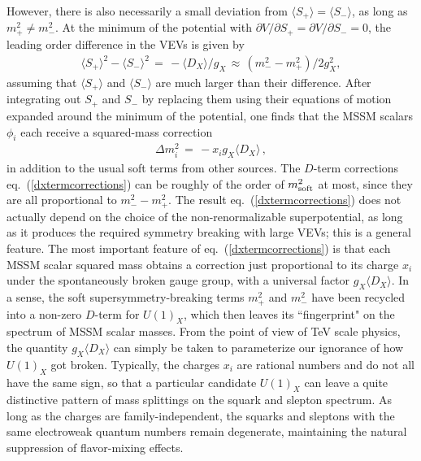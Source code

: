 \documentclass[11pt]{article}
\def\beq{\begin{eqnarray}}
\def\eeq{\end{eqnarray}}
\def\Splus{S_+}
\def\Sminus{S_-}
\begin{document}
However, there is also necessarily a small deviation from $\langle 
\Splus\rangle = \langle \Sminus \rangle$, as long as $m_+^2 \not= 
m_-^2$. At the minimum of the potential with $\partial V/\partial 
\Splus = \partial V/\partial \Sminus = 0$, the leading order difference in 
the VEVs is given by
\beq
 \langle \Splus \rangle^2 - \langle \Sminus \rangle^2 
\,=\, -\langle D_X \rangle/g_X 
\,\approx\,  (m_-^2 - m_+^2)/2 g_X^2,
\eeq
assuming that $\langle \Splus \rangle$ and $\langle \Sminus \rangle$ are 
much larger than their difference. After integrating out $\Splus$ and 
$\Sminus$ by replacing them using their equations of motion expanded 
around the minimum of the potential, one finds that the MSSM scalars 
$\phi_i$ each receive a squared-mass correction
\beq
\Delta m_i^2 \,=\,  -x_i g_X \langle D_X \rangle\, ,
\label{dxtermcorrections}
\eeq
in addition to the usual soft terms from other sources. The $D$-term
corrections eq.~(\ref{dxtermcorrections}) can be roughly of the order of
$m_{\rm soft}^2$ at most, since they are all proportional to $m_-^2-
m_+^2$. The result eq.~(\ref{dxtermcorrections}) does not
actually depend on the choice of the non-renormalizable superpotential, as
long as it produces the required symmetry breaking with large VEVs; this
is a general feature. The most important feature of
eq.~(\ref{dxtermcorrections}) is that each MSSM scalar squared mass
obtains a correction just proportional to its charge $x_i$ under the
spontaneously broken gauge group, with a universal factor $g_X \langle D_X
\rangle$. In a sense, the soft supersymmetry-breaking terms $m_+^2$ and
$m_-^2$ have been recycled into a non-zero $D$-term for $U(1)_X$,
which then leaves its ``fingerprint" on the spectrum of MSSM scalar
masses. From the point of view of TeV scale physics, the quantity $g_X
\langle D_X \rangle$ can simply be taken to parameterize our ignorance of
how $U(1)_X$ got broken. Typically, the charges $x_i$ are rational numbers
and do not all have the same sign, so that a particular candidate $U(1)_X$
can leave a quite distinctive pattern of mass splittings on the squark and
slepton spectrum. As long as the charges are family-independent, the
squarks and sleptons with the same electroweak quantum numbers remain
degenerate, maintaining the natural suppression of flavor-mixing effects. 
\end{document}
